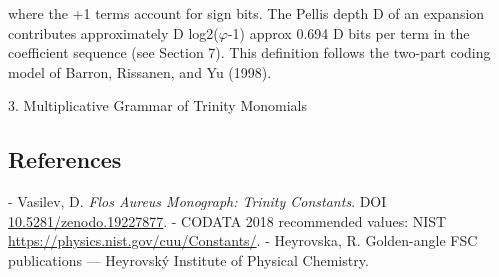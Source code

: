   where the +1 terms account for sign bits. The Pellis depth D of an expansion
  contributes approximately D log2($\varphi$-1) approx 0.694 D bits per term in the coefficient
  sequence (see Section 7). This definition follows the two-part coding model of Barron,
  Rissanen, and Yu (1998).

  3. Multiplicative Grammar of Trinity Monomials

\subsection{References}

- Vasilev, D. \textit{Flos Aureus Monograph: Trinity Constants}. DOI \href{https://zenodo.org/doi/10.5281/zenodo.19227877}{10.5281/zenodo.19227877}.
- CODATA 2018 recommended values: NIST \href{https://physics.nist.gov/cuu/Constants/}{https://physics.nist.gov/cuu/Constants/}.
- Heyrovska, R. Golden-angle FSC publications --- Heyrovský Institute of Physical Chemistry.
